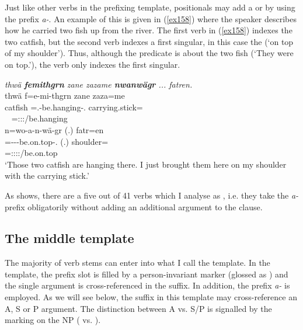 Just like other verbs in the prefixing template, positionals may add a  or  by using the  prefix \emph{a-}. An example of this is given in (\ref{ex158}) where the speaker describes how he carried two fish up from the river. The first verb in (\ref{ex158}) indexes the two catfish, but the second verb indexes a first singular, in this case the  (`on top of my shoulder'). Thus, although the predicate is about the two fish (`They were on top.'), the verb only indexes the first singular.

\begin{exe}
	\ex \emph{thwä \textbf{femithgrn} zane zazame \textbf{nwanwägr} ... fatren.}\\
	\glll thwä f=e-mi-thgrn zane {zaza=me}\\
	catfish \Dist=\Stnsg{}.\Alph-be.hanging-\Stat.{\Du} {\Prox} {carrying.stick}={\Ins}\\
	~ {\footnotesize \Dist=\Stdu:\Sbj:\Nonpast:\Stat/be.hanging} ~ ~\\
	\sn
	\glll n=wo-a-n-wä-gr (.) fatr=en\\
	\Immpst=\Fsg-\Vc-\Venit-be.on.top-\Stat.{\Ndu} (.) shoulder=\Loc\\
	{\footnotesize \Immpst=\Fsg:\Io:\Nonpast:\Stat:\Venit/be.on.top} ~ ~\\
	\trans `Those two catfish are hanging there. I just brought them here on my shoulder with the carrying stick.' 
	\label{ex158}
\end{exe}

As  shows, there are a five out of 41  verbs which I analyse as , i.e. they take the \emph{a-} prefix obligatorily without adding an additional argument to the clause.

\subsection{The middle template} \label{middletemplatesubsection}

The majority of verb stems can enter into what I call the  template. In the  template, the prefix slot is filled by a person-invariant  marker (glossed as \M{}) and the single argument is cross-referenced in the suffix. In addition, the  prefix \emph{a-} is employed. As we will see below, the suffix in this template may cross-reference an A, S or P argument. The distinction between A vs. S/P is signalled by the  marking on the NP ( vs. ).

